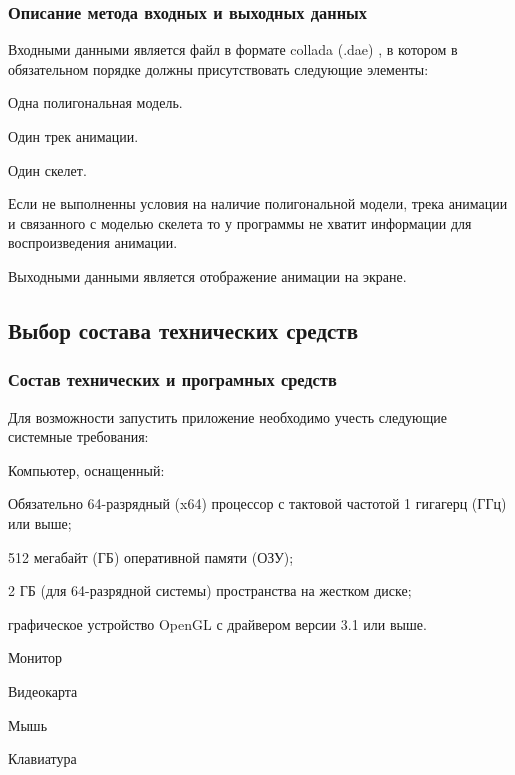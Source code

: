 \subsubsection{Описание метода входных и выходных данных}
Входными данными является файл в формате collada (.dae)
, в котором в обязательном порядке должны присутствовать следующие элементы:
\begin{my_enumerate}
\item Одна полигональная модель.
\item Один трек анимации.
\item Один скелет.
\end{my_enumerate}

Если не выполненны условия на наличие полигональной модели,
трека анимации и связанного с моделью скелета то
у программы не хватит информации для воспроизведения анимации.

Выходными данными является отображение анимации на экране.


\subsection{Выбор состава технических средств}

\subsubsection{Состав технических и програмных средств}
Для возможности запустить приложение необходимо учесть следующие системные требования:
\begin{my_enumerate}
\item Компьютер, оснащенный:
    \begin{my_enumerate}
    \item Обязательно 64-разрядный (x64) процессор с тактовой частотой 1 гигагерц (ГГц) или выше;
    \item 512 мегабайт (ГБ) оперативной памяти (ОЗУ);
    \item 2 ГБ (для 64-разрядной системы) пространства на жестком диске;
    \item графическое устройство OpenGL с драйвером версии 3.1 или выше.
    \end{my_enumerate}
\item Монитор
\item Видеокарта
\item Мышь
\item Клавиатура
\end{my_enumerate}

